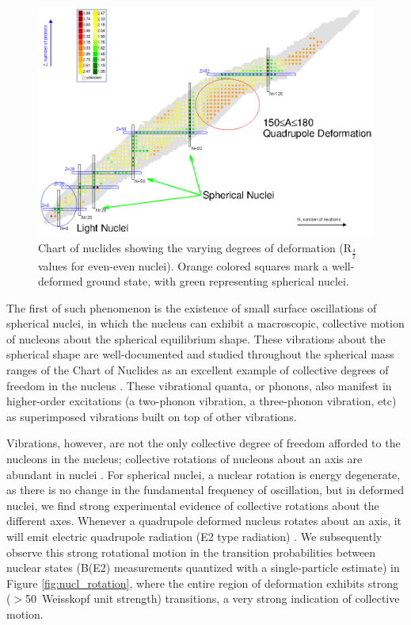 \begin{figure}[h!] 
\begin{center}
\includegraphics[width=\textwidth]{Chart_of_Nuclides_def.eps}
\caption{Chart of nuclides showing the varying degrees of deformation (R$_\frac{4}{2}$ values for even-even nuclei). Orange colored squares mark a well-deformed ground state, with green representing spherical nuclei.}
\label{fig:chart_nuclides}
\end{center}
\end{figure}

The first of such phenomenon is the existence of small surface oscillations of spherical nuclei, in which the nucleus can exhibit a macroscopic, collective motion of nucleons about the spherical equilibrium shape. These vibrations about the spherical shape are well-documented and studied throughout the spherical mass ranges of the Chart of Nuclides as an excellent example of collective degrees of freedom in the nucleus \cite{Casten_text,Aprahamian_118Cd}. These vibrational quanta, or phonons, also manifest in higher-order excitations (a two-phonon vibration, a three-phonon vibration, etc) as superimposed vibrations built on top of other vibrations.

Vibrations, however, are not the only collective degree of freedom afforded to the nucleons in the nucleus; collective rotations of nucleons about an axis are abundant in nuclei \cite{Casten_text,Wong_text}. For spherical nuclei, a nuclear rotation is energy degenerate, as there is no change in the fundamental frequency of oscillation, but in deformed nuclei, we find strong experimental evidence of collective rotations about the different axes. Whenever a quadrupole deformed nucleus rotates about an axis, it will emit electric quadrupole radiation (E2 type radiation) \cite{Rowe_Wood_text}. We subsequently observe this strong rotational motion in the transition probabilities between nuclear states (B(E2) measurements quantized with a single-particle estimate) in Figure \ref{fig:nucl_rotation}, where the entire region of deformation exhibits strong ($>$50~Weisskopf unit strength) transitions, a very strong indication of collective motion.

